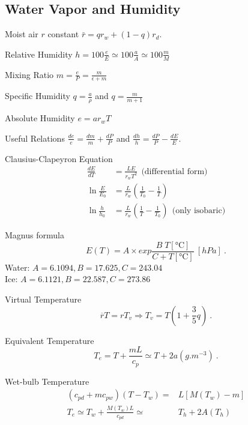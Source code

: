 \documentclass[10pt]{article}
\newcommand{\gc}{\degreeCelsius}
\begin{document}
\begin{multicols}{3}
\section{Water Vapor and Humidity}
\begin{ttdesc}[labelwidth=\widthof{\ttfamily{letterpaper/a4paper}}]
\item[Moist air $r$ constant] $\bar r = q r_w + (1-q) r_d$.
\item[Relative Humidity] $h = 100\frac{e}{E}\simeq 100 \frac{a}{A} \simeq 100 \frac{m}{M}$
\item[Mixing Ratio] $m = \frac e P = \frac m {\epsilon + m}$
\item[Specific Humidity] $q=\frac{a}{\rho}$ and $q=\frac m {m+1}$
\item[Absolute Humidity] $e = a r_w T$
\item[Useful Relations]  $\frac{de}{e}=\frac{dm}{m}+\frac{dP}{P}$ and
 $\frac{dh}{h}=\frac{dP}{P}-\frac{dE}{E}$.
\item[Clausius-Clapeyron Equation]
\begin{align*}
\frac{dE}{dT} &= \frac {L E}{r_w T^2} ~~\text{(differential form)} \\
\ln\frac E {E_0} &= \frac L {r_w} \left(\frac 1 {T_0} - \frac 1 T \right)\\
\ln\frac h {h_0} &= \frac L {r_w} \left(\frac 1 T - \frac 1 {T_0}\right) ~~\text{(only isobaric)}
\end{align*}
\item[Magnus formula] 
\begin{displaymath}
E(T) =  A \times exp{\frac{B\;  T[\si{\gc}]}{C + T[\si{\gc}]}} \ [\si{hPa}] \ .
\end{displaymath}
Water: $A = 6.1094, B = 17.625, C = 243.04$\\
Ice: $A = 6.1121, B = 22.587, C = 273.86$
\item[Virtual Temperature] 
\begin{displaymath}
\overline{r} T= r T_v \Rightarrow T_v=T \left( 1 + \frac 3 5 q \right)~.
\end{displaymath}
\item[Equivalent Temperature] 
\begin{displaymath}
T_e=T+\frac{m L}{c_p} \simeq T + 2 a \left( \si{g.m^{-3}} \right)~.
\end{displaymath}
\item[Wet-bulb Temperature]
\begin{align*} 
  (c_{pd}+m c_{pw}) (T-T_w) =& L [M(T_w)-m] \nonumber \\
T_e \simeq T_w + \frac{M(T_w) L}{c_{pd}} \simeq& T_h + 2 A(T_h)
\end{align*}
\end{ttdesc}
%

\end{multicols}
\end{document}
